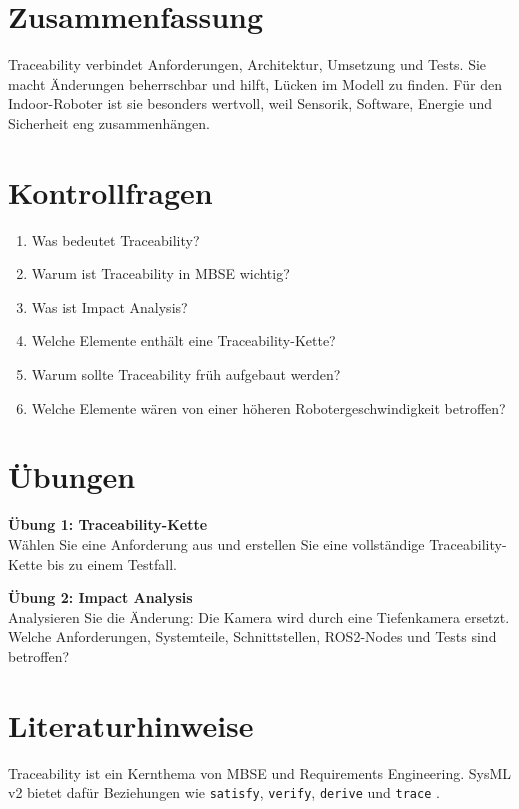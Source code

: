 \section{Zusammenfassung}
Traceability verbindet Anforderungen, Architektur, Umsetzung und Tests. Sie macht Änderungen beherrschbar und hilft, Lücken im Modell zu finden. Für den Indoor-Roboter ist sie besonders wertvoll, weil Sensorik, Software, Energie und Sicherheit eng zusammenhängen.

\section{Kontrollfragen}
\begin{enumerate}
    \item Was bedeutet Traceability?
    \item Warum ist Traceability in MBSE wichtig?
    \item Was ist Impact Analysis?
    \item Welche Elemente enthält eine Traceability-Kette?
    \item Warum sollte Traceability früh aufgebaut werden?
    \item Welche Elemente wären von einer höheren Robotergeschwindigkeit betroffen?
\end{enumerate}

\section{Übungen}
\begin{uebungbox}
\textbf{Übung 1: Traceability-Kette}\\
Wählen Sie eine Anforderung aus und erstellen Sie eine vollständige Traceability-Kette bis zu einem Testfall.
\end{uebungbox}

\begin{uebungbox}
\textbf{Übung 2: Impact Analysis}\\
Analysieren Sie die Änderung: Die Kamera wird durch eine Tiefenkamera ersetzt. Welche Anforderungen, Systemteile, Schnittstellen, ROS2-Nodes und Tests sind betroffen?
\end{uebungbox}

\section{Literaturhinweise}
Traceability ist ein Kernthema von MBSE und Requirements Engineering. SysML v2 bietet dafür Beziehungen wie \texttt{satisfy}, \texttt{verify}, \texttt{derive} und \texttt{trace} \cite{sysmlv2pilot}.
